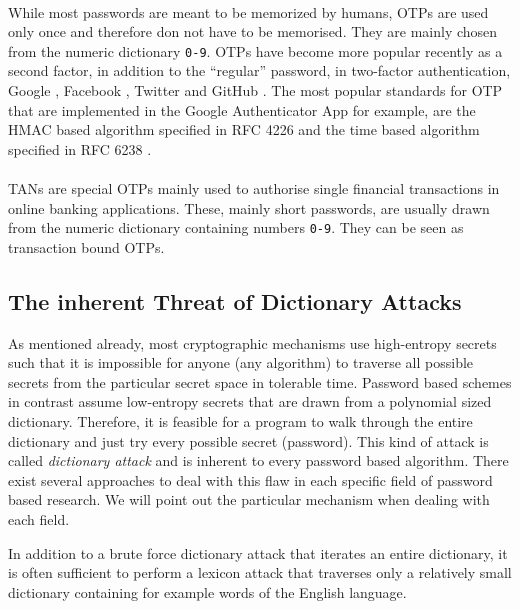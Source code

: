 \paragraph{}
While most passwords are meant to be memorized by humans, \acp{OTP} are used only once and therefore don not have to be memorised.
They are mainly chosen from the numeric dictionary \texttt{0-9}.
\acp{OTP} have become more popular recently as a second factor, in addition to the ``regular'' password, in two-factor authentication, \eg Google \cite{Google2Factor}, Facebook \cite{FB2Factor}, Twitter \cite{Twitter2Factor} and GitHub \cite{Github2Factor}.
The most popular standards for \ac{OTP} that are implemented in the Google Authenticator App \cite{GAuthenticator} for example, are the \acs{HMAC} based algorithm specified in RFC 4226 \cite{rfc4226} and the time based algorithm specified in RFC 6238 \cite{rfc6238}.

\paragraph{}
\acp{TAN} are special \acp{OTP} mainly used to authorise single financial transactions in online banking applications.
These, mainly short passwords, are usually drawn from the numeric dictionary containing numbers \texttt{0-9}.
They can be seen as transaction bound \acp{OTP}.

\subsection{The inherent Threat of Dictionary Attacks}\label{sec:introdictionaryattacks}
As mentioned already, most cryptographic mechanisms use high-entropy secrets such that it is impossible for anyone (any algorithm) to traverse all possible secrets from the particular secret space in tolerable time.
Password based schemes in contrast assume low-entropy secrets that are drawn from a polynomial sized dictionary.
Therefore, it is feasible for a program to walk through the entire dictionary and just try every possible secret (password).
This kind of attack is called \emph{dictionary attack} and is inherent to every password based algorithm.
There exist several approaches to deal with this flaw in each specific field of password based research.
We will point out the particular mechanism when dealing with each field.

In addition to a brute force dictionary attack that iterates an entire dictionary, it is often sufficient to perform a lexicon attack that traverses only a relatively small dictionary containing for example words of the English language.

